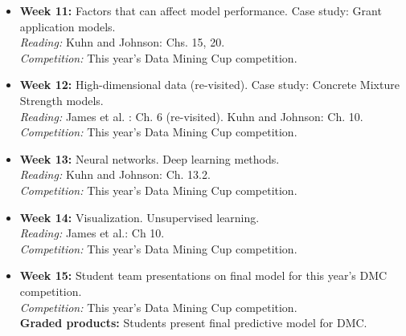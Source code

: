 \documentclass[11pt,oneside]{amsart}
\begin{document}
\begin{itemize}
\item \textbf{Week 11:} Factors that can affect model performance. Case study: Grant application models. \\
\emph{Reading:} Kuhn and Johnson: Chs. 15, 20. \\
\emph{Competition:} This year's Data Mining Cup competition.

\item \textbf{Week 12:} High-dimensional data (re-visited). Case study: Concrete Mixture Strength models.\\
\emph{Reading:} James et al. : Ch. 6 (re-visited). Kuhn and Johnson: Ch. 10.\\
\emph{Competition:} This year's Data Mining Cup competition.

\item \textbf{Week 13:} Neural networks. Deep learning methods. \\
\emph{Reading:} Kuhn and Johnson: Ch. 13.2. \\
\emph{Competition:} This year's Data Mining Cup competition.

\item \textbf{Week 14:} Visualization. Unsupervised learning.\\
\emph{Reading:} James et al.: Ch 10. \\
\emph{Competition:} This year's Data Mining Cup competition.

\item \textbf{Week 15:} Student team presentations on final model for
  this year's DMC  competition.\\
\emph{Competition:} This year's Data Mining Cup competition.\\
\textbf{Graded products:} Students present final predictive model for
DMC.

\end{itemize}
\end{document}

